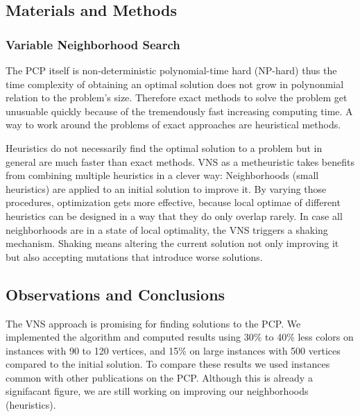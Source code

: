 \documentclass[paper = a4, fontsize = 10pt]{scrartcl}
\begin{document}
\subsection*{Materials and Methods}

\subsubsection*{Variable Neighborhood Search}
The PCP itself is non-deterministic polynomial-time hard (NP-hard) thus the time complexity of obtaining an optimal solution does not grow in polynonmial relation to the problem's size. Therefore exact methods to solve the problem get unusuable quickly because of the tremendously fast increasing computing time. A way to work around the problems of exact approaches are heuristical methods.

Heuristics do not necessarily find the optimal solution to a problem but in general are much faster than exact methods. VNS as a metheuristic takes benefits from combining multiple heuristics in a clever way: Neighborhoods (small heuristics) are applied to an initial solution to improve it. By varying those procedures, optimization gets more effective, because local optimae of different heuristics can be designed in a way that they do only overlap rarely. In case all neighborhoods are in a state of local optimality, the VNS triggers a shaking mechanism. Shaking means altering the current solution not only improving it but also accepting mutations that introduce worse solutions.

\subsection*{Observations and Conclusions}

The VNS approach is promising for finding solutions to the PCP. We implemented the algorithm and computed results using 30\% to 40\% less colors on instances with 90 to 120 vertices, and 15\% on large instances with 500 vertices compared to the initial solution. To compare these results we used instances common with other publications on the PCP. Although this is already a signifacant figure, we are still working on improving our neighborhoods (heuristics).
\end{document}
